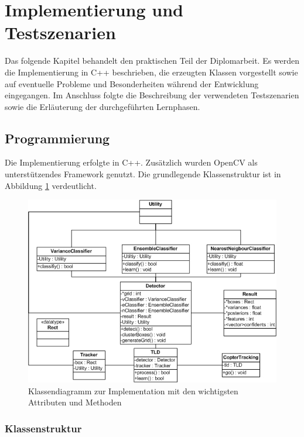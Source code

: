 \section{Implementierung und Testszenarien}
Das folgende Kapitel behandelt den praktischen Teil der Diplomarbeit. Es werden die Implementierung in C++ beschrieben, die erzeugten Klassen vorgestellt sowie auf eventuelle Probleme und Besonderheiten während der Entwicklung eingegangen. Im Anschluss folgte die Beschreibung der verwendeten Testszenarien sowie die Erläuterung der durchgeführten Lernphasen.

\subsection{Programmierung}
Die Implementierung erfolgte in C++. Zusätzlich wurden OpenCV als unterstützendes Framework genutzt. Die grundlegende Klassenstruktur ist in Abbildung \ref{klassendiagramm} verdeutlicht.

\begin{figure}
\begin{centering}
\includegraphics{../pictures/Klassendiagrammvsd.jpg}
\caption{Klassendiagramm zur Implementation mit den wichtigsten Attributen und Methoden}
\label{klassendiagramm}
\par\end{centering}
\end{figure}

\subsubsection{Klassenstruktur}
